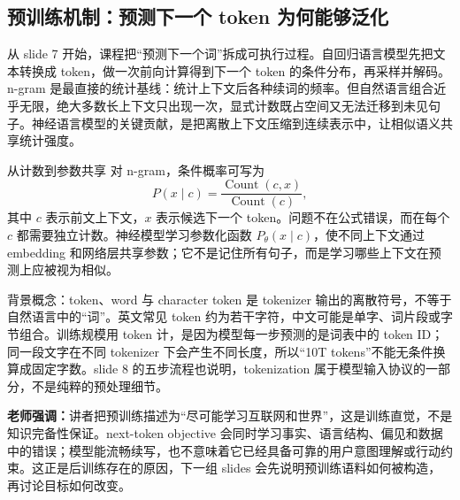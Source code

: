 \subsection{预训练机制：预测下一个 token 为何能够泛化}

从 slide 7 开始，课程把“预测下一个词”拆成可执行过程。自回归语言模型先把文本转换成 token，做一次前向计算得到下一个 token 的条件分布，再采样并解码。n-gram 是最直接的统计基线：统计上下文后各种续词的频率。但自然语言组合近乎无限，绝大多数长上下文只出现一次，显式计数既占空间又无法迁移到未见句子。神经语言模型的关键贡献，是把离散上下文压缩到连续表示中，让相似语义共享统计强度。


\begin{importantbox}{从计数到参数共享}
对 n-gram，条件概率可写为
\[
P(x\mid c)=\frac{\operatorname{Count}(c,x)}{\operatorname{Count}(c)},
\]
其中 $c$ 表示前文上下文，$x$ 表示候选下一个 token。问题不在公式错误，而在每个 $c$ 都需要独立计数。神经模型学习参数化函数 $P_\theta(x\mid c)$，使不同上下文通过 embedding 和网络层共享参数；它不是记住所有句子，而是学习哪些上下文在预测上应被视为相似。
\end{importantbox}

\begin{knowledgebox}{背景概念：token、word 与 character}
token 是 tokenizer 输出的离散符号，不等于自然语言中的“词”。英文常见 token 约为若干字符，中文可能是单字、词片段或字节组合。训练规模用 token 计，是因为模型每一步预测的是词表中的 token ID；同一段文字在不同 tokenizer 下会产生不同长度，所以“10T tokens”不能无条件换算成固定字数。slide 8 的五步流程也说明，tokenization 属于模型输入协议的一部分，不是纯粹的预处理细节。
\end{knowledgebox}

\textbf{老师强调：}讲者把预训练描述为“尽可能学习互联网和世界”，这是训练直觉，不是知识完备性保证。next-token objective 会同时学习事实、语言结构、偏见和数据中的错误；模型能流畅续写，也不意味着它已经具备可靠的用户意图理解或行动约束。这正是后训练存在的原因，下一组 slides 会先说明预训练语料如何被构造，再讨论目标如何改变。

